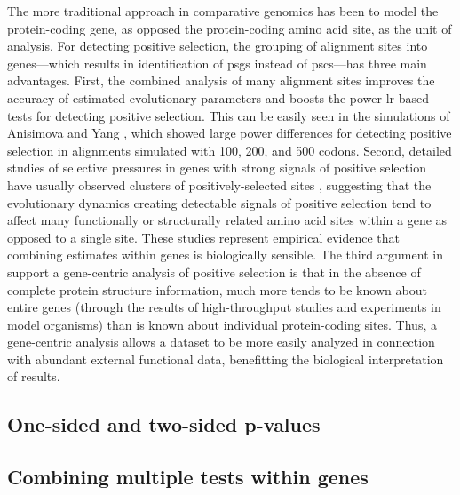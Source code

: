 The more traditional approach in comparative genomics has been to
model the protein-coding gene, as opposed the protein-coding amino
acid site, as the unit of analysis. For detecting positive selection,
the grouping of alignment sites into genes---which results in
identification of \acp{psg} instead of \acp{psc}---has three main
advantages. First, the combined analysis of many alignment sites
improves the accuracy of estimated evolutionary parameters and boosts
the power \ac{lr}-based tests for detecting positive selection. This
can be easily seen in the simulations of Anisimova and Yang
\citeyearpar{Anisimova2001,Anisimova2001}, which showed large power
differences for detecting positive selection in alignments simulated
with 100, 200, and 500 codons. Second, detailed studies of \sw
selective pressures in genes with strong signals of positive selection
have usually observed clusters of positively-selected sites
\citep{Sawyer2005a,Kosiol2008}, suggesting that the evolutionary
dynamics creating detectable signals of positive selection tend to
affect many functionally or structurally related amino acid sites
within a gene as opposed to a single site. These studies represent
empirical evidence that combining \sw estimates within genes is
biologically sensible. The third argument in support a gene-centric
analysis of positive selection is that in the absence of complete
protein structure information, much more tends to be known about
entire genes (through the results of high-throughput studies and
experiments in model organisms) than is known about individual
protein-coding sites. Thus, a gene-centric analysis allows a dataset
to be more easily analyzed in connection with abundant external
functional data, benefitting the biological interpretation of results.

\subsection{One-sided and two-sided p-values}


\subsection{Combining multiple \sw tests within genes}

